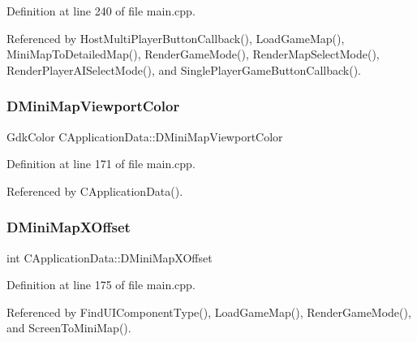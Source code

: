 Definition at line 240 of file main.\+cpp.



Referenced by Host\+Multi\+Player\+Button\+Callback(), Load\+Game\+Map(), Mini\+Map\+To\+Detailed\+Map(), Render\+Game\+Mode(), Render\+Map\+Select\+Mode(), Render\+Player\+A\+I\+Select\+Mode(), and Single\+Player\+Game\+Button\+Callback().

\hypertarget{classCApplicationData_a9a19207b43eece4000159fb1f1d831c3}{}\label{classCApplicationData_a9a19207b43eece4000159fb1f1d831c3} 
\subsubsection{\texorpdfstring{D\+Mini\+Map\+Viewport\+Color}{DMiniMapViewportColor}}
{\footnotesize\ttfamily Gdk\+Color C\+Application\+Data\+::\+D\+Mini\+Map\+Viewport\+Color\hspace{0.3cm}{\ttfamily [protected]}}



Definition at line 171 of file main.\+cpp.



Referenced by C\+Application\+Data().

\hypertarget{classCApplicationData_ae651b9d3963288c5c1f5aaf53bf9401d}{}\label{classCApplicationData_ae651b9d3963288c5c1f5aaf53bf9401d} 
\subsubsection{\texorpdfstring{D\+Mini\+Map\+X\+Offset}{DMiniMapXOffset}}
{\footnotesize\ttfamily int C\+Application\+Data\+::\+D\+Mini\+Map\+X\+Offset\hspace{0.3cm}{\ttfamily [protected]}}



Definition at line 175 of file main.\+cpp.



Referenced by Find\+U\+I\+Component\+Type(), Load\+Game\+Map(), Render\+Game\+Mode(), and Screen\+To\+Mini\+Map().

\hypertarget{classCApplicationData_ad33fc850bd8262a4bdf1f23e9477d5ad}{}\label{classCApplicationData_ad33fc850bd8262a4bdf1f23e9477d5ad} 
